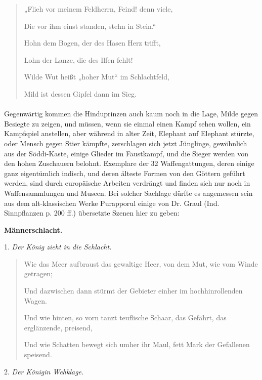 \documentclass{article}
\begin{document}
\begin{quotation}\small
„Flieh vor meinem Feldherrn, Feind! denn viele,

Die vor ihm einst standen, stehn in Stein.“

\bigskip

Hohn dem Bogen, der des Hasen Herz trifft,

Lohn der Lanze, die des Ilfen fehlt!

\bigskip

Wilde Wut heißt „hoher Mut“ im Schlachtfeld,

Mild ist dessen Gipfel dann im Sieg.
\end{quotation}
\paragraph{}
Gegenwärtig kommen die Hinduprinzen auch kaum noch in die Lage, Milde gegen Besiegte zu zeigen, und müssen, wenn sie einmal einen Kampf sehen wollen, ein Kampfspiel anstellen, aber während in alter Zeit, Elephant auf Elephant stürzte, oder Mensch gegen Stier kämpfte, zerschlagen sich jetzt Jünglinge, gewöhnlich aus der Söddi-Kaste, einige Glieder im Faustkampf, und die Sieger werden von den hohen Zuschauern belohnt. Exemplare der 32 Waffengattungen, deren einige ganz eigentümlich indisch, und deren älteste Formen von den Göttern geführt werden, sind durch europäische Arbeiten verdrängt und finden sich nur noch in Waffensammlungen und Museen. Bei solcher Sachlage dürfte es angemessen sein aus dem alt-klassischen Werke Purapporul einige von Dr. Graul (Ind. Sinnpflanzen p. 200 ff.) übersetzte Szenen hier zu geben:
\begin{center}
\textbf{Männerschlacht.}
\end{center}
\begin{center}
1. \emph{Der König zieht in die Schlacht.}
\end{center}
\begin{quotation}\small
Wie das Meer aufbraust das gewaltige Heer, von dem Mut, wie vom Winde getragen;

Und dazwischen dann stürmt der Gebieter einher im hochhinrollenden Wagen.

Und wie hinten, so vorn tanzt teuflische Schaar, das Gefährt, das erglänzende, preisend,

Und wie Schatten bewegt sich umher ihr Maul, fett Mark der Gefallenen speisend.
\end{quotation}
\begin{center}
2. \emph{Der Königin Wehklage.}
\end{center}
\end{document}
